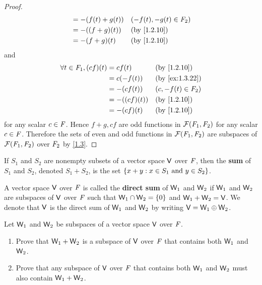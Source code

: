 \begin{proof}
\begin{align*}
                                         & = -\p{f\p{t} + g\p{t}} &  & (-f\p{t}, -g\p{t} \in \F_{2}) \\
                                         & = -\p{\p{f + g}\p{t}}  &  & \text{(by \cref{1.2.10})}     \\
                                         & = -\p{f + g}\p{t}      &  & \text{(by \cref{1.2.10})}
  \end{align*}
  and
  \begin{align*}
    \forall t \in \F_{1}, \p{cf}\p{t} & = cf\p{t}          &  & \text{(by \cref{1.2.10})}    \\
                                      & = c\p{-f\p{t}}     &  & \text{(by \cref{ex:1.3.22})} \\
                                      & = -\p{cf\p{t}}     &  & (c, -f\p{t} \in \F_{2})      \\
                                      & = -\p{\p{cf}\p{t}} &  & \text{(by \cref{1.2.10})}    \\
                                      & = -\p{cf}\p{t}     &  & \text{(by \cref{1.2.10})}
  \end{align*}
  for any scalar \(c \in \mathit{F}\).
  Hence \(f + g, cf\) are odd functions in \(\fs{\F_{1}}{\F_{2}}\) for any scalar \(c \in \mathit{F}\).
  Therefore the sets of even and odd functions in \(\fs{\F_{1}}{\F_{2}}\) are subspaces of \(\fs{\F_{1}}{\F_{2}}\) over \(\mathit{F}_{2}\) by \cref{1.3}.
\end{proof}

\begin{defn}\label{1.3.10}
  If \(S_{1}\) and \(S_{2}\) are nonempty subsets of a vector space \(\mathsf{V}\) over \(\mathit{F}\), then the \textbf{sum} of \(S_{1}\) and \(S_{2}\), denoted \(S_{1} + S_{2}\), is the set \(\left\lbrace x + y : x \in S_{1} \text{ and } y \in S_{2}\right\rbrace\).
\end{defn}

\begin{defn}\label{1.3.11}
  A vector space \(\mathsf{V}\) over \(\mathit{F}\) is called the \textbf{direct sum} of \(\mathsf{W}_{1}\) and \(\mathsf{W}_{2}\) if \(\mathsf{W}_{1}\) and \(\mathsf{W}_{2}\) are subspaces of \(\mathsf{V}\) over \(\mathit{F}\) such that \(\mathsf{W}_{1} \cap \mathsf{W}_{2} = \left\lbrace0\right\rbrace\) and \(\mathsf{W}_{1} + \mathsf{W}_{2} = \mathsf{V}\).
  We denote that \(\mathsf{V}\) is the direct sum of \(\mathsf{W}_{1}\) and \(\mathsf{W}_{2}\) by writing \(\mathsf{V} = \mathsf{W}_{1} \oplus \mathsf{W}_{2}\).
\end{defn}

\begin{ex}\label{ex:1.3.23}
  Let \(\mathsf{W}_{1}\) and \(\mathsf{W}_{2}\) be subspaces of a vector space \(\mathsf{V}\) over \(\mathit{F}\).
  \begin{enumerate}
    \item Prove that \(\mathsf{W}_{1} + \mathsf{W}_{2}\) is a subspace of \(\mathsf{V}\) over \(\mathit{F}\) that contains both \(\mathsf{W}_{1}\) and \(\mathsf{W}_{2}\).
    \item Prove that any subspace of \(\mathsf{V}\) over \(\mathit{F}\) that contains both \(\mathsf{W}_{1}\) and \(\mathsf{W}_{2}\) must also contain \(\mathsf{W}_{1} + \mathsf{W}_{2}\).
  \end{enumerate}
\end{ex}

